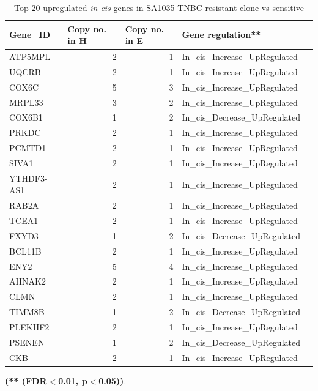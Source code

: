  \begin{table}[htbp]
   \centering
   \caption{Top 20 upregulated \textit{in cis} genes in SA1035-TNBC resistant clone vs sensitive}
     \begin{tabular}{|l|r|r|l|r}
     \hline
     \textbf{Gene\_ID} & \multicolumn{1}{|l|}{\textbf{Copy no. in H}} & \multicolumn{1}{|l|}{\textbf{Copy no. in E}} & \textbf{Gene regulation**}\\
     
     \hline
     ATP5MPL & 2 & 1 & In\_cis\_Increase\_UpRegulated \\
     UQCRB & 2 & 1 & In\_cis\_Increase\_UpRegulated   \\
     COX6C & 5 & 3 & In\_cis\_Increase\_UpRegulated  \\
     MRPL33 & 3 & 2 & In\_cis\_Increase\_UpRegulated \\
     COX6B1 & 1 & 2 & In\_cis\_Decrease\_UpRegulated  \\
     PRKDC & 2 & 1 & In\_cis\_Increase\_UpRegulated  \\
     PCMTD1 & 2 & 1 & In\_cis\_Increase\_UpRegulated \\
     SIVA1 & 2 & 1 & In\_cis\_Increase\_UpRegulated \\
     YTHDF3-AS1 & 2 & 1 & In\_cis\_Increase\_UpRegulated \\
     RAB2A & 2 & 1 & In\_cis\_Increase\_UpRegulated \\
     TCEA1 & 2 & 1 & In\_cis\_Increase\_UpRegulated  \\
     FXYD3 & 1 & 2 & In\_cis\_Decrease\_UpRegulated  \\
     BCL11B & 2 & 1 & In\_cis\_Increase\_UpRegulated  \\
     ENY2 & 5 & 4 & In\_cis\_Increase\_UpRegulated  \\
     AHNAK2 & 2 & 1 & In\_cis\_Increase\_UpRegulated  \\
     CLMN & 2 & 1 & In\_cis\_Increase\_UpRegulated  \\
     TIMM8B & 1 & 2 & In\_cis\_Decrease\_UpRegulated  \\
     PLEKHF2 & 2 & 1 & In\_cis\_Increase\_UpRegulated  \\
     PSENEN & 1 & 2 & In\_cis\_Decrease\_UpRegulated  \\
     CKB & 2 & 1 & In\_cis\_Increase\_UpRegulated  \\
     
     \hline
     \end{tabular}%
   
   \label{tab:top20SA1035upregulated}%
 
   \small\textbf{(** (FDR$<$0.01, p$<$0.05))}.
 \end{table}%

